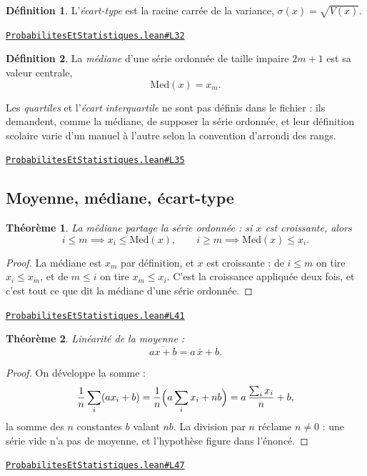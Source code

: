 \documentclass[11pt,a4paper]{article}
\theoremstyle{definition}
\newtheorem{definition}{Définition}
\theoremstyle{plain}
\newtheorem{theoreme}{Théorème}
\newcommand{\source}[2]{\par\smallskip\noindent\hfill{\footnotesize\href{#1}{\texttt{#2}}}\par\smallskip}
\begin{document}
\begin{definition}
L'\emph{écart-type} est la racine carrée de la variance,
$\sigma(x) = \sqrt{V(x)}$.
\end{definition}
\source{https://github.com/Commutator-IO/learn-lean/blob/main/courses/02-lycee/09-probabilites-et-statistiques/ProbabilitesEtStatistiques.lean\#L32}{ProbabilitesEtStatistiques.lean\#L32}

\begin{definition}
La \emph{médiane} d'une série ordonnée de taille impaire $2m + 1$ est sa valeur centrale,
\[ \mathrm{Med}(x) = x_m . \]

\medskip\noindent
Les \emph{quartiles} et l'\emph{écart interquartile} ne sont pas définis dans le fichier :
ils demandent, comme la médiane, de supposer la série ordonnée, et leur définition scolaire
varie d'un manuel à l'autre selon la convention d'arrondi des rangs.
\end{definition}
\source{https://github.com/Commutator-IO/learn-lean/blob/main/courses/02-lycee/09-probabilites-et-statistiques/ProbabilitesEtStatistiques.lean\#L35}{ProbabilitesEtStatistiques.lean\#L35}

\subsection{Moyenne, médiane, écart-type}

\begin{theoreme}
La médiane partage la série ordonnée : si $x$ est croissante, alors
\[ i \le m \implies x_i \le \mathrm{Med}(x) , \qquad
   i \ge m \implies \mathrm{Med}(x) \le x_i . \]
\end{theoreme}

\begin{proof}
La médiane est $x_m$ par définition, et $x$ est croissante : de $i \le m$ on tire
$x_i \le x_m$, et de $m \le i$ on tire $x_m \le x_i$. C'est la croissance appliquée deux
fois, et c'est tout ce que dit la médiane d'une série ordonnée.
\end{proof}
\source{https://github.com/Commutator-IO/learn-lean/blob/main/courses/02-lycee/09-probabilites-et-statistiques/ProbabilitesEtStatistiques.lean\#L41}{ProbabilitesEtStatistiques.lean\#L41}

\begin{theoreme}
Linéarité de la moyenne :
\[ \overline{ax + b} = a\,\bar x + b . \]
\end{theoreme}

\begin{proof}
On développe la somme :
\[ \frac{1}{n}\sum_i (a x_i + b)
   = \frac{1}{n}\Bigl(a\sum_i x_i + nb\Bigr)
   = a\,\frac{\sum_i x_i}{n} + b , \]
la somme des $n$ constantes $b$ valant $nb$. La division par $n$ réclame $n \ne 0$ : une
série vide n'a pas de moyenne, et l'hypothèse figure dans l'énoncé.
\end{proof}
\source{https://github.com/Commutator-IO/learn-lean/blob/main/courses/02-lycee/09-probabilites-et-statistiques/ProbabilitesEtStatistiques.lean\#L47}{ProbabilitesEtStatistiques.lean\#L47}
\end{document}
